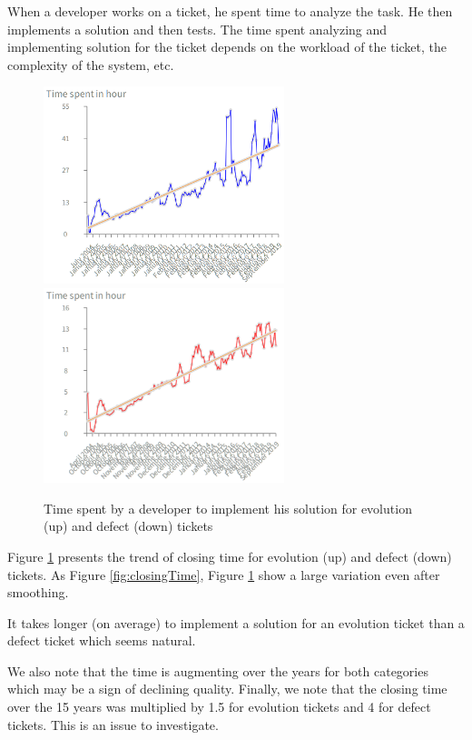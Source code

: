 \documentclass[10pt,conference]{IEEEtran}
\begin{document}
When a developer works on a ticket, he spent time to analyze the task. 
He then implements a solution and then tests.
 The time spent analyzing and implementing solution for the ticket depends on the workload of the ticket, the complexity of the system, etc.  

\begin{figure}[htbp]
  \centering
  \includegraphics[width=70mm]{./images/devEvol.png}\\
  \includegraphics[width=70mm]{./images/devDefect.png}
  \caption{Time spent by a developer to implement his solution for  evolution (up) and defect (down) tickets}
  \label{fig:devTimeDev}
\end{figure}

Figure \ref{fig:devTimeDev} presents the trend of closing time for evolution (up) and defect (down) tickets.
As Figure \ref{fig:closingTime}, Figure \ref{fig:devTimeDev} show a large variation even after smoothing.

It takes longer (on average) to implement a solution for an evolution ticket than a defect ticket which seems natural.

We also note that the time is augmenting over the years for both categories which may be a sign of declining quality.
Finally, we note that the closing time over the 15 years was multiplied by 1.5 for evolution tickets and 4 for defect tickets.
This is an issue to investigate.
\end{document}
